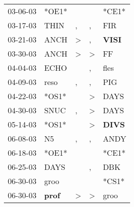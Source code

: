 \begin{supertabular}{p{0.07\textwidth}p{0.06\textwidth}p{0.02\textwidth}p{0.02\textwidth}p{0.06\textwidth}}
          03-06-03\textsuperscript{} &                            *OE1* &                  &                  &                            *CE1* \\
          03-17-03\textsuperscript{} &           THIN\textsuperscript{} &                , &                , &            FIR\textsuperscript{} \\
          03-21-03\textsuperscript{} &           ANCH\textsuperscript{} &     \textgreater &                , &  \textbf{VISI\textsuperscript{}} \\
          03-30-03\textsuperscript{} &           ANCH\textsuperscript{} &     \textgreater &     \textgreater &             FF\textsuperscript{} \\
          04-04-03\textsuperscript{} &           ECHO\textsuperscript{} &                  &                , &           fles\textsuperscript{} \\
          04-09-03\textsuperscript{} &           reso\textsuperscript{} &                , &                , &            PIG\textsuperscript{} \\
          04-22-03\textsuperscript{} &                            *OS1* &                  &     \textgreater &           DAYS\textsuperscript{} \\
          04-30-03\textsuperscript{} &           SNUC\textsuperscript{} &                , &     \textgreater &           DAYS\textsuperscript{} \\
          05-14-03\textsuperscript{} &                            *OS1* &                  &     \textgreater &  \textbf{DIVS\textsuperscript{}} \\
          06-08-03\textsuperscript{} &             N5\textsuperscript{} &                , &                , &           ANDY\textsuperscript{} \\
          06-18-03\textsuperscript{} &                            *OE1* &                  &                  &                            *CE1* \\
          06-25-03\textsuperscript{} &           DAYS\textsuperscript{} &                  &                , &            DBK\textsuperscript{} \\
          06-30-03\textsuperscript{} &           groo\textsuperscript{} &                  &                  &                            *CS1* \\
          06-30-03\textsuperscript{} &  \textbf{prof\textsuperscript{}} &     \textgreater &     \textgreater &           groo\textsuperscript{} \\

\end{supertabular}

